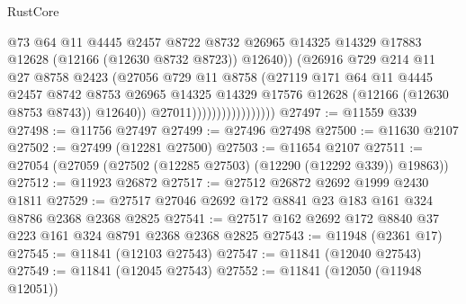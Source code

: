 \begin{lexlean}{RustCore}
\begin{coremodule}
                                        @73
                                        @64
                                        @11
                                        @4445
                                        @2457
                                        @8722
                                        @8732
                                        @26965
                                        @14325
                                        @14329
                                        @17883
                                        @12628
                                        (@12166 (@12630 @8732 @8723))
                                        @12640))
                                    (@26916
                                      @729
                                      @214
                                      @11
                                      @27
                                      @8758
                                      @2423
                                      (@27056
                                        @729
                                        @11
                                        @8758
                                        (@27119
                                          @171
                                          @64
                                          @11
                                          @4445
                                          @2457
                                          @8742
                                          @8753
                                          @26965
                                          @14325
                                          @14329
                                          @17576
                                          @12628
                                          (@12166 (@12630 @8753 @8743))
                                          @12640))
                                      @27011)))))))))))))))))
@27497 := @11559 @339
@27498 := @11756 @27497
@27499 := @27496 @27498
@27500 := @11630 @2107
@27502 := @27499 (@12281 @27500)
@27503 := @11654 @2107
@27511 := @27054 (@27059 (@27502 (@12285 @27503) (@12290 (@12292 @339)) @19863))
@27512 := @11923 @26872
@27517 := @27512 @26872 @2692 @1999 @2430 @1811
@27529 := @27517 @27046 @2692 @172 @8841 @23 @183 @161 @324 @8786 @2368 @2368 @2825
@27541 := @27517 @162 @2692 @172 @8840 @37 @223 @161 @324 @8791 @2368 @2368 @2825
@27543 := @11948 (@2361 @17)
@27545 := @11841 (@12103 @27543)
@27547 := @11841 (@12040 @27543)
@27549 := @11841 (@12045 @27543)
@27552 := @11841 (@12050 (@11948 @12051))

\end{coremodule}
\end{lexlean}
